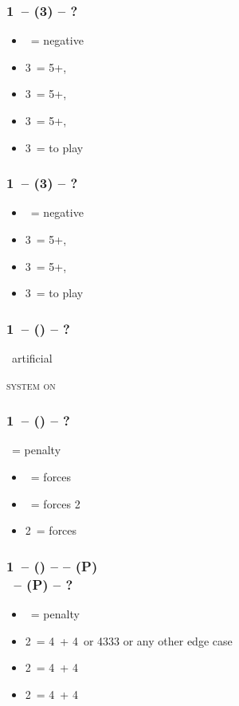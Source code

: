 \documentclass[12pt, a4paper]{report}
\begin{document}
\subsubsection*{1\ntx\ -- (3\clubs) -- ?}
\begin{itemize}
    \item \dbl\ = negative
    \item 3\diams\ = 5+\hearts, \invp
    \item 3\hearts\ = 5+\spades, \invp
    \item 3\spades\ = 5+\diams, \invp
    \item 3\nt\ = to play
\end{itemize}

\subsubsection*{1\ntx\ -- (3\diams) -- ?}
\begin{itemize}
    \item \dbl\ = negative
    \item 3\hearts\ = 5+\spades, \invp
    \item 3\spades\ = 5+\hearts, \gf
    \item 3\nt\ = to play
\end{itemize}

\subsubsection*{1\ntx\ -- (\alrts{\dbl}) -- ?}
\dbl\ artificial

\textsc{system on}

\subsubsection*{1\ntx\ -- (\dbl) -- ?}
\dbl\ = penalty
\begin{itemize}
    \item \pass\ = forces \rdbl
    \item \rdbl\ = forces 2\clubs
    \item 2\ = forces 
\end{itemize}

\subsubsection*{1\ntx\ -- (\dbl) --  -- (P)\\
                \rdbl\ -- (P) -- ?}
\begin{itemize}
    \item \pass\ = penalty
    \item 2\clubs\ = 4\clubs\ + 4\ or 4333 or any other edge case
    \item 2\diams\ = 4\diams\ + 4\major
    \item 2\hearts\ = 4\hearts\ + 4\spades
\end{itemize}
\end{document}
